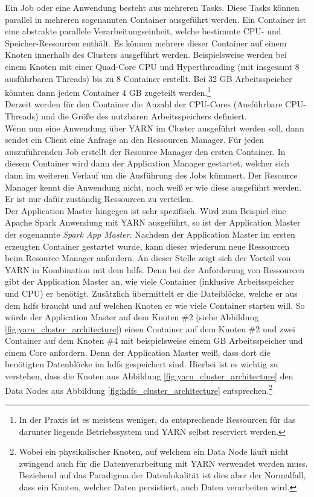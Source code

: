 \noindent
Ein Job oder eine Anwendung besteht aus mehreren Tasks. Diese Tasks können parallel in mehreren sogenannten Container ausgeführt werden. Ein Container ist eine abstrakte parallele Verarbeitungseinheit, welche bestimmte CPU- und Speicher-Ressourcen enthält. Es können mehrere dieser Container auf einem Knoten innerhalb des Clusters ausgeführt werden. Beispielsweise werden bei einem Knoten mit einer Quad-Core CPU und Hyperthreading (mit insgesamt 8 ausführbaren Threads) bis zu 8 Container erstellt. Bei 32 GB Arbeitsspeicher könnten dann jedem Container 4 GB zugeteilt werden.\footnote{In der Praxis ist es meistens weniger, da entsprechende Ressourcen für das darunter liegende Betriebssystem und YARN selbst reserviert werden.}\\
Derzeit werden für den Container die Anzahl der CPU-Cores (Ausführbare CPU-Threads) und die Größe des nutzbaren Arbeitsspeichers definiert.\cite[S. 48 ff.]{expert_hadoop_admin}\\

\noindent
Wenn nun eine Anwendung über YARN im Cluster ausgeführt werden soll, dann sendet ein Client eine Anfrage an den Ressourcen Manager. 
Für jeden auszuführenden Job erstellt der Resource Manager den ersten Container. In diesem Container wird dann der Application Manager gestartet, welcher sich dann im weiteren Verlauf um die Ausführung des Jobs kümmert. Der Resource Manager kennt die Anwendung nicht, noch weiß er wie diese ausgeführt werden. 
Er ist nur dafür zuständig Ressourcen zu verteilen.\\ 
Der Application Master hingegen ist sehr spezifisch. Wird zum Beispiel eine Apache Spark Anwendung mit YARN ausgeführt, so ist der Application Master der sogenannte \textit{Spark App Master}. Nachdem der Application Master im ersten erzeugten Container gestartet wurde, kann dieser wiederum neue Ressourcen beim Resource Manager anfordern. 
An dieser Stelle zeigt sich der Vorteil von YARN in Kombination mit dem \gls{hdfs}. Denn bei der Anforderung von Ressourcen gibt der Application Master an, wie viele Container (inklusive Arbeitsspeicher und CPU) er benötigt. Zusätzlich übermittelt er die Dateiblöcke, welche er aus dem \gls{hdfs} braucht und auf welchen Knoten er wie viele Container starten will. So würde der Application Master auf dem Knoten \#2 (siehe Abbildung \ref{fig:yarn_cluster_architecture}) einen Container auf dem Knoten \#2 und zwei Container auf dem Knoten \#4 mit beispielsweise einem GB Arbeitsspeicher und einem Core anfordern. 
Denn der Application Master weiß, dass dort die benötigten Datenblöcke im \gls{hdfs} gespeichert sind. Hierbei ist es wichtig zu verstehen, dass die Knoten aus Abbildung \ref{fig:yarn_cluster_architecture} den Data Nodes aus Abbildung \ref{fig:hdfs_cluster_architecture} entsprechen.\footnote{Wobei ein physikalischer Knoten, auf welchem ein Data Node läuft nicht zwingend auch für die Datenverarbeitung mit YARN verwendet werden muss. Beziehend auf das Paradigma der Datenlokalität ist dies aber der Normalfall, dass ein Knoten, welcher Daten persistiert, auch Daten verarbeiten wird.}\\

